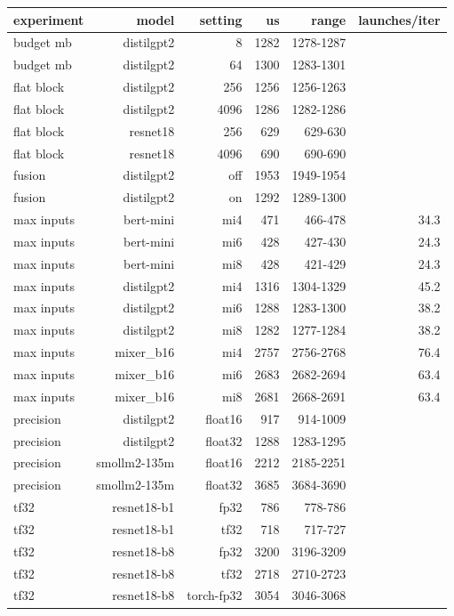\begin{tabular}{lrrrrr}
\toprule
experiment & model & setting & us & range & launches/iter \\
\midrule
budget mb & distilgpt2 & 8 & 1282 & 1278-1287 &  \\
budget mb & distilgpt2 & 64 & 1300 & 1283-1301 &  \\
flat block & distilgpt2 & 256 & 1256 & 1256-1263 &  \\
flat block & distilgpt2 & 4096 & 1286 & 1282-1286 &  \\
flat block & resnet18 & 256 & 629 & 629-630 &  \\
flat block & resnet18 & 4096 & 690 & 690-690 &  \\
fusion & distilgpt2 & off & 1953 & 1949-1954 &  \\
fusion & distilgpt2 & on & 1292 & 1289-1300 &  \\
max inputs & bert-mini & mi4 & 471 & 466-478 & 34.3 \\
max inputs & bert-mini & mi6 & 428 & 427-430 & 24.3 \\
max inputs & bert-mini & mi8 & 428 & 421-429 & 24.3 \\
max inputs & distilgpt2 & mi4 & 1316 & 1304-1329 & 45.2 \\
max inputs & distilgpt2 & mi6 & 1288 & 1283-1300 & 38.2 \\
max inputs & distilgpt2 & mi8 & 1282 & 1277-1284 & 38.2 \\
max inputs & mixer\_b16 & mi4 & 2757 & 2756-2768 & 76.4 \\
max inputs & mixer\_b16 & mi6 & 2683 & 2682-2694 & 63.4 \\
max inputs & mixer\_b16 & mi8 & 2681 & 2668-2691 & 63.4 \\
precision & distilgpt2 & float16 & 917 & 914-1009 &  \\
precision & distilgpt2 & float32 & 1288 & 1283-1295 &  \\
precision & smollm2-135m & float16 & 2212 & 2185-2251 &  \\
precision & smollm2-135m & float32 & 3685 & 3684-3690 &  \\
tf32 & resnet18-b1 & fp32 & 786 & 778-786 &  \\
tf32 & resnet18-b1 & tf32 & 718 & 717-727 &  \\
tf32 & resnet18-b8 & fp32 & 3200 & 3196-3209 &  \\
tf32 & resnet18-b8 & tf32 & 2718 & 2710-2723 &  \\
tf32 & resnet18-b8 & torch-fp32 & 3054 & 3046-3068 &  \\
\bottomrule
\end{tabular}
